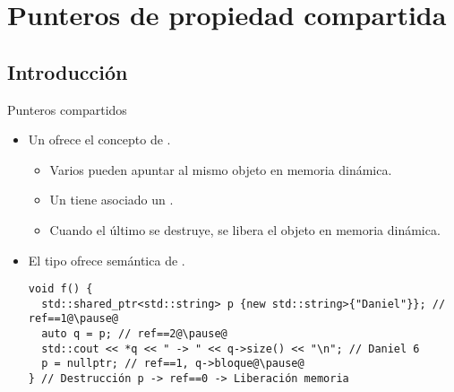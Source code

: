 \section{Punteros de propiedad compartida}

\subsection{Introducción}

\begin{frame}[t,fragile]{Punteros compartidos}
\begin{itemize}
  \item Un  ofrece el concepto de
        .
    \begin{itemize}
      \pause
      \item Varios  pueden apuntar al mismo
            objeto en memoria dinámica.

      \pause
      \item Un  tiene asociado un 
            .

      \pause
      \item Cuando el último  se destruye,
            se libera el objeto en memoria dinámica.
    \end{itemize}

  \item El tipo  ofrece semántica de 
        .
\begin{lstlisting}[escapechar=@]
void f() {
  std::shared_ptr<std::string> p {new std::string>{"Daniel"}}; // ref==1@\pause@
  auto q = p; // ref==2@\pause@
  std::cout << *q << " -> " << q->size() << "\n"; // Daniel 6
  p = nullptr; // ref==1, q->bloque@\pause@
} // Destrucción p -> ref==0 -> Liberación memoria
\end{lstlisting}

\end{itemize}
\end{frame}

